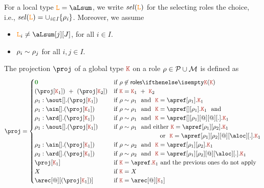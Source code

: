 For a local type $\aL = \aLsum$, we write $\it{sel}(\texttt{\textcolor{orange}L})$ for the selecting roles the choice, i.e.,
$\it{sel}(\texttt{\textcolor{orange}L}) = \cup_{i\in I}{\{\rho_i\}}$.
%
Moreover, we assume
\begin{itemize}
\item $\aL_i \neq\aLsum[j][J]$, for all $i \in I$.
\item $\rho_i \sim \rho_j$ for all $i,j \in I$.
\end{itemize}

The projection $\proj$ of a global type $\aK$ on a role
$\rho \in \mathcal{P} \cup \mathcal{M}$ is defined as
\[
  \proj =
  \begin{cases}
    \nil & \text{if } \arole \not \in \roles \aK
    \\
    (\proj[\aK_1]) \ + \ (\proj[\aK_2])
    &
    \text{if } \aK = \aK_1 \ + \ \aK_2
    \\
    \arole_1 : \aout[].(\proj[\aK_1])
    &
    \text{if } \arole \eqR \arole_1\ \text{ and }\ \aK = \apref[\arole_1].\aK_1
    \\
    \arole_1 : \ain[].(\proj[\aK_1])
    &
    \text{if } \arole \eqR \arole_1\ \text{ and }\ \aK = \apref[{}][\arole_1].\aK_1 \ \text{ and }
    \\
    \arole_1 : \ard[].(\proj[\aK_1])
    &
    \text{if } \arole \eqR \arole_1\ \text{ and }\ \aK = \apref[{}][\arole_1][@][@][.].\aK_1
    \\
    \arole_1 : \aout[].(\proj[\aK_1])
    &
    \text{if } \arole \eqR \arole_1\ \text{ and either}\ \aK = \apref[\arole_1][\arole_2].\aK_1
    \\
    &
    \hspace{2.5cm}\text{ or }\ \aK = \apref[\arole_1][\arole_2][@][\aloc][.].\aK_1
    \\
    \arole_2 : \ain[].(\proj[\aK_1])
    &
    \text{if } \arole \eqR \arole_2\ \text{ and }\ \aK = \apref[\arole_1][\arole_2].\aK_1
    \\
    \arole_2 : \ard[].(\proj[\aK_1])
    &
    \text{if } \arole \eqR \arole_2\ \text{ and }\ \aK = \apref[\arole_1][\arole_2][@][\aloc][.].\aK_1
    \\
    \proj[\aK_1]
    &
    \text{if } \aK = \apref.\aK_1 \text{ and the previous ones do not apply}
   \\
   X
   & \text{if } \aK = X
   \\
   \arec[@][{(\proj[\aK_1])}]
   &
   \text{if } \aK = \arec[@][\aK_1]
  \end{cases}
\]


